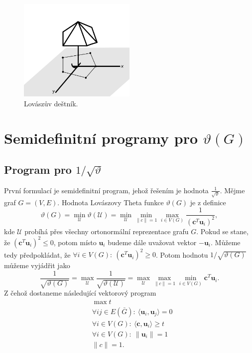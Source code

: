 \begin{figure}[h!]
    \centering
    \includegraphics[width=0.5\textwidth]{img/umbrella.png} 
    \caption{Lovászův deštník.}
    \label{fig:umbrella}
\end{figure}


\section{Semidefinitní programy pro $\vartheta(G)$}

\subsection*{Program pro $1/\sqrt{\vartheta}$}

První formulací je semidefinitní program, jehož řešením je hodnota $\frac{1}{\sqrt{\vartheta}}$. Mějme graf $G = (V,E)$. Hodnota Lovászovy Theta funkce $\vartheta(G)$ je z definice
$$
    \vartheta(G) = \min_\mathcal{U} \vartheta(\mathcal{U}) = \min_\mathcal{U} \min_{\|c\|=1} \max_{i \in V(G)} \frac{1}{\left( \mathbf{c}^T \mathbf{u}_i \right)^2},
$$
kde $\mathcal{U}$ probíhá přes všechny ortonormální reprezentace grafu $G$. Pokud se stane, že $\left( \mathbf{c}^T \mathbf{u}_i \right)^2 \leq 0$, potom místo $\mathbf{u}_i$ budeme dále uvažovat vektor $-\mathbf{u}_i$. Můžeme tedy předpokládat, že $\forall i \in V(G):\ \left( \mathbf{c}^T \mathbf{u}_i \right)^2 \geq 0$. Potom hodnotu $1/\sqrt{\vartheta(G)}$ můžeme vyjádřit jako
$$
    \frac{1}{\sqrt{\vartheta(G)}} = \max_\mathcal{U} \frac{1}{\sqrt{\vartheta(\mathcal{U})}} = \max_\mathcal{U} \max_{\|c\|=1} \min_{i \in V(G)} \mathbf{c}^T\mathbf{u}_i.
$$
Z čehož dostaneme následující vektorový program
\begin{equation}\tag{VP1}
    \begin{split}
        &\max t \\
        &\forall ij \in E(\bar{G}):\ \langle \mathbf{u}_i, \mathbf{u}_j \rangle = 0 \\
        &\forall i \in V(G):\ \langle \mathbf{c}, \mathbf{u}_i \rangle \geq t \\
        &\forall i \in V(G):\ \| \mathbf{u}_i \| = 1 \\
        &\| c \| = 1.
    \end{split}
    \label{eq:VP1}
\end{equation}

